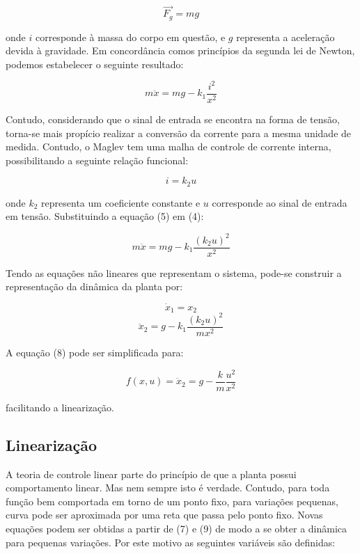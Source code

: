 \documentclass{ifacconf}
\begin{document}
\begin{equation}
    \vec{F_g} = mg
\end{equation}

\noindent onde $i$ corresponde à massa do corpo em questão, e $g$ representa a aceleração devida à gravidade. Em concordância comos princípios da segunda lei de Newton, podemos estabelecer o
seguinte resultado:

\begin{equation}
    m\ddot{x} = mg - k_1 \frac{i^2}{x^2}
\end{equation}

Contudo, considerando que o sinal de entrada se encontra na forma de tensão, torna-se mais propício realizar a conversão da corrente para a mesma unidade de medida. Contudo, o Maglev tem uma malha de controle de corrente interna, possibilitando a seguinte relação funcional:

\begin{equation}
    i = k_2u
\end{equation}

\noindent onde $k_2$ representa um coeficiente constante e $u$ corresponde ao sinal de entrada em tensão. Substituindo a equação (5) em (4):

\begin{equation}
    m\ddot{x} = mg - k_1 \frac{(k_2u)^2}{x^2}
\end{equation}

Tendo as equações não lineares que representam o sistema, pode-se
construir a representação da dinâmica da planta por:

\begin{equation}
    \dot{x}_1 = x_2
\end{equation}
\begin{equation}
    \ddot{x}_2 = g - k_1 \frac{(k_2u)^2}{mx^2}
\end{equation}

A equação (8) pode ser simplificada para:

\begin{equation}
    f(x,u) = \ddot{x}_2 = g - \frac{k}{m} \frac{u^2}{x^2}
\end{equation}

\noindent facilitando a linearização.

\subsection{Linearização}

A teoria de controle linear parte do princípio de que a planta
possui comportamento linear. Mas nem sempre isto é
verdade. Contudo, para toda função bem comportada em torno de
um ponto fixo, para variações pequenas, curva pode ser aproximada por uma reta que passa pelo ponto fixo. Novas equações podem ser obtidas a partir de (7) e (9) de modo a se obter a dinâmica para pequenas variações. Por este motivo as seguintes variáveis são definidas:
\end{document}
